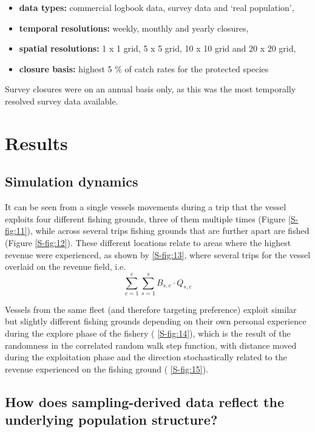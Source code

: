 \documentclass[review]{elsarticle}
\begin{document}
\begin{itemize}
	\item \textbf{data types:} commercial logbook data, survey data and
		`real population',
	\item \textbf{temporal resolutions:} weekly, monthly and yearly
		closures,
	\item \textbf{spatial resolutions:} 1 x 1 grid, 5 x 5 grid, 10 x 10
		grid and 20 x 20 grid,
	\item \textbf{closure basis:} highest 5 \%  of catch rates for the
		protected species
\end{itemize}

Survey closures were on an annual basis only, as this was the most temporally
resolved survey data available.

\section{Results}

\subsection{Simulation dynamics}

It can be seen from a single vessels movements during a trip that the vessel
exploits four different fishing grounds, three of them multiple times (Figure
\ref{S-fig:11}), while across several trips fishing grounds that are further
apart are fished (Figure \ref{S-fig:12}). These different locations relate to
areas where the highest revenue were experienced, as shown by
 \ref{S-fig:13}, where several trips for the vessel
overlaid on the revenue field, i.e. 
$$\sum^c_{c=1}\sum^s_{s=1} B_{s,c} \cdot Q_{s,c}$$

Vessels from the same fleet (and therefore targeting preference) exploit
similar but slightly different fishing grounds depending on their own personal
experience during the explore phase of the fishery (
\ref{S-fig:14}), which is the result of the randomness in the correlated random
walk step function, with distance moved during the exploitation phase and the
direction stochastically related to the revenue experienced on the fishing
ground (
\ref{S-fig:15}). 

\subsection{How does sampling-derived data reflect the underlying population
	structure?}
\end{document}
